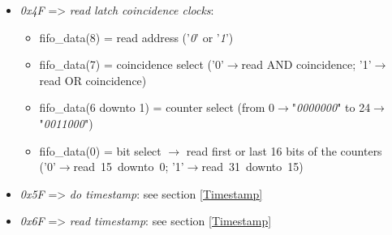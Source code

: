 \begin{itemize}
\begin{itemize}
	\end{itemize}
	\item \textit{0x4F} => \textit{read latch coincidence clocks}:
	\begin{itemize}
		\item fifo\_data(8) = read address ('\textit{0}' or '\textit{1}')
		\item fifo\_data(7) = coincidence select ('0'$\rightarrow$read AND coincidence; '1'$\rightarrow$read OR coincidence)
		\item fifo\_data(6 downto 1) = counter select (from 0$\rightarrow$"\textit{0000000}" to 24$\rightarrow$"\textit{0011000}")
		\item fifo\_data(0) = bit select $\rightarrow$ read first or last 16 bits of the counters \\('0'$\rightarrow$read~15~downto~0; '1'$\rightarrow$read~31~downto~15)
	\end{itemize}
	\item \textit{0x5F} => \textit{do timestamp}: see section \ref{Timestamp}
	\item \textit{0x6F} => \textit{read timestamp}: see section \ref{Timestamp}
\end{itemize}

